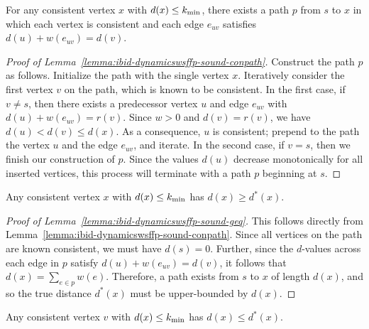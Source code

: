 \begin{lemma}
For any consistent vertex $x$ with $d(x) \leq k_{\mbox{\scriptsize min}}$,
there exists a path $p$ from $s$ to $x$
in which each vertex is consistent
and each edge $e_{uv}$ satisfies $d(u) + w(e_{uv}) = d(v)$.
\label{lemma:ibid-dynamicswsffp-sound-conpath}
\end{lemma}

\begin{proof}[Proof of Lemma~\ref{lemma:ibid-dynamicswsffp-sound-conpath}]
Construct the path $p$ as follows.
Initialize the path with the single vertex $x$.
Iteratively consider the first vertex $v$ on the path,
which is known to be consistent.
In the first case, if $v \neq s$,
then there exists a predecessor vertex $u$ and edge $e_{uv}$
with $d(u) + w(e_{uv}) = r(v)$.
Since $w > 0$ and $d(v) = r(v)$,
we have $d(u) < d(v) \leq d(x)$.
As a consequence,
$u$ is consistent;
prepend to the path the vertex $u$ and the edge $e_{uv}$,
and iterate.
In the second case, if $v = s$,
then we finish our construction of $p$.
Since the values $d(u)$ decrease monotonically
for all inserted vertices,
this process will terminate with a path $p$ beginning at $s$.
\end{proof}

\begin{lemma}
Any consistent vertex $x$ with $d(x) \leq k_{\mbox{\scriptsize min}}$
has $d(x) \geq d^*(x)$.
\label{lemma:ibid-dynamicswsffp-sound-geq}
\end{lemma}

\begin{proof}[Proof of Lemma~\ref{lemma:ibid-dynamicswsffp-sound-geq}]
This follows directly from
Lemma~\ref{lemma:ibid-dynamicswsffp-sound-conpath}.
Since all vertices on the path are known consistent,
we must have $d(s) = 0$.
Further,
since the $d$-values across each edge in $p$
satisfy $d(u) + w(e_{uv}) = d(v)$,
it follows that $d(x) = \sum_{e \in p} w(e)$.
Therefore,
a path exists from $s$ to $x$ of length $d(x)$,
and so the true distance $d^*(x)$ must be upper-bounded by $d(x)$.
\end{proof}

\begin{lemma}
Any consistent vertex $v$ with $d(x) \leq k_{\mbox{\scriptsize min}}$
has $d(x) \leq d^*(x)$.
\label{lemma:ibid-dynamicswsffp-sound-leq}
\end{lemma}

